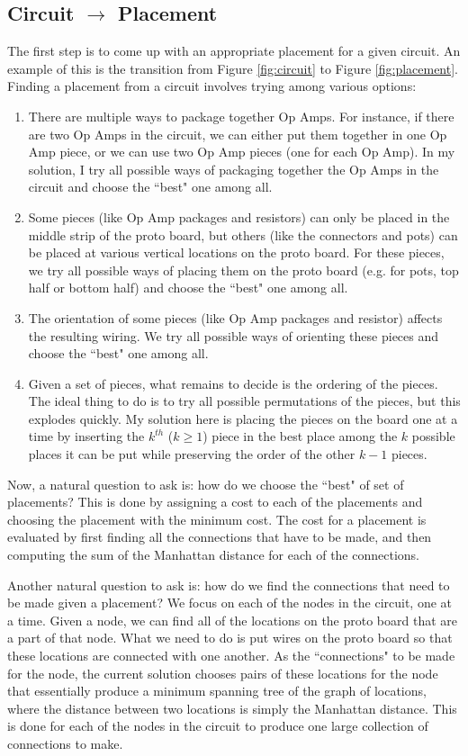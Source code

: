 \documentclass[12pt]{amsart}
\begin{document}
\subsection{Circuit $\rightarrow$ Placement}

The first step is to come up with an appropriate placement for a given circuit. An example of this is the transition from Figure \ref{fig:circuit} to Figure \ref{fig:placement}. Finding a placement from a circuit involves trying among various options:

\begin{enumerate}
\item There are multiple ways to package together Op Amps. For instance, if there are two Op Amps in the circuit, we can either put them together in one Op Amp piece, or we can use two Op Amp pieces (one for each Op Amp). In my solution, I try all possible ways of packaging together the Op Amps in the circuit and choose the ``best" one among all.
\item Some pieces (like Op Amp packages and resistors) can only be placed in the middle strip of the proto board, but others (like the connectors and pots) can be placed at various vertical locations on the proto board. For these pieces, we try all possible ways of placing them on the proto board (e.g. for pots, top half or bottom half) and choose the ``best" one among all.
\item The orientation of some pieces (like Op Amp packages and resistor) affects the resulting wiring. We try all possible ways of orienting these pieces and choose the ``best" one among all.
\item Given a set of pieces, what remains to decide is the ordering of the pieces. The ideal thing to do is to try all possible permutations of the pieces, but this explodes quickly. My solution here is placing the pieces on the board one at a time by inserting the $k^{th}$ ($k \ge 1$) piece in the best place among the $k$ possible places it can be put while preserving the order of the other $k - 1$ pieces.
\end{enumerate}

Now, a natural question to ask is: how do we choose the ``best" of  set of placements? This is done by assigning a cost to each of the placements and choosing the placement with the minimum cost. The cost for a placement is evaluated by first finding all the connections that have to be made, and then computing the sum of the Manhattan distance for each of the connections.

Another natural question to ask is: how do we find the connections that need to be made given a placement? We focus on each of the nodes in the circuit, one at a time. Given a node, we can find all of the locations on the proto board that are a part of that node. What we need to do is put wires on the proto board so that these locations are connected with one another. As the ``connections" to be made for the node, the current solution chooses pairs of these locations for the node that essentially produce a minimum spanning tree of the graph of locations, where the distance between two locations is simply the Manhattan distance. This is done for each of the nodes in the circuit to produce one large collection of connections to make.
\end{document}

